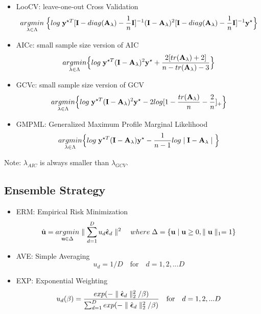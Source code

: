 \documentclass{beamer}
\begin{document}
\begin{frame}
\begin{itemize}
\item LooCV: leave-one-out Cross Validation
$$\underset{\lambda \in \Lambda}{argmin}\;\Big\{log\;{\bf y}^{\star T}[{\bf I}-diag({\bf A}_\lambda)-\frac{1}{n}{\bf I}]^{-1}({\bf I}-{\bf A}_\lambda)^2[{\bf I}-diag({\bf A}_\lambda)-\frac{1}{n}{\bf I}]^{-1}{\bf y}^\star \Big\}$$
\item AICc: small sample size version of AIC
$$\underset{\lambda \in \Lambda}{argmin}\Big\{log\; {\bf y}^{\star T}({\bf I}-{\bf A}_\lambda)^2{\bf y}^\star+\frac{2[tr({\bf A}_\lambda)+2]}{n-tr({\bf A}_\lambda)-3}\Big\}$$
\item GCVc: small sample size version of GCV
$$\underset{\lambda \in \Lambda}{argmin}\Big\{log\; {\bf y}^{\star T}({\bf I}-{\bf A}_\lambda)^2{\bf y}^\star-2log[1-\frac{tr({\bf A}_\lambda)}{n}-\frac{2}{n}]_+\Big\}$$
\item GMPML: Generalized Maximum Profile Marginal Likelihood
$$\underset{\lambda \in \Lambda}{argmin}\Big\{log\; {\bf y}^{\star T}({\bf I}-{\bf A}_\lambda){\bf y}^\star-\frac{1}{n-1}log \mid {\bf I}-{\bf A}_\lambda \mid \Big\}$$
\end{itemize}
\end{frame}

\begin{frame}
\label{lambda: aic_gcv}
Note: $\lambda_{AIC}$ is always smaller than $\lambda_{GCV}$. \hyperlink{proof: aic_gcv}{}
\end{frame}


\subsection{Ensemble Strategy}
\begin{frame}
\begin{itemize}
\item ERM: Empirical Risk Minimization
$$\hat{{\bf u}}=\underset{{\bf u} \in \Delta}{argmin}\parallel \sum_{d=1}^Du_d\hat{\boldsymbol{\epsilon}}_d\parallel^2 \quad where\; \Delta=\{{\bf u} \mid {\bf u} \geq 0, \parallel {\bf u} \parallel_1=1\}$$
\item AVE: Simple Averaging
$$u_d=1/D \quad \mbox{for} \quad d=1,2,...D$$
\item EXP: Exponential Weighting
$$u_d(\beta)=\frac{exp(-\parallel \hat{\boldsymbol{\epsilon}}_d \parallel_2^2/\beta)}{\sum_{d=1}^Dexp(-\parallel \hat{\boldsymbol{\epsilon}}_d \parallel_2^2/\beta)}\quad \mbox{for} \quad d=1,2,...D$$
\end{itemize}
\end{frame}
\end{document}
